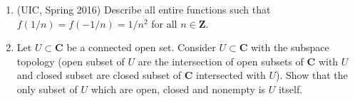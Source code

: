 \documentclass[a4paper,10pt]{article}
\newcommand{\ZZ}{\mathbf{Z}}
\newcommand{\CC}{\mathbf{C}}
\begin{document}
\begin{enumerate}
\item (UIC, Spring 2016)
Describe all entire functions such that $f(1/n) = f(-1/n) = 1/n^2$ for all $n\in \ZZ$.

\item Let $U \subset \CC$ be a connected open set. Consider $U\subset \CC$ with the subspace topology (open subset of $U$ are the intersection of open subsets of $\CC$ with $U$ and closed subset are closed subset of $\CC$ intersected with $U$). Show that the only subset of $U$ which are open, closed and nonempty is $U$ itself. 



\end{enumerate}
\end{document}
